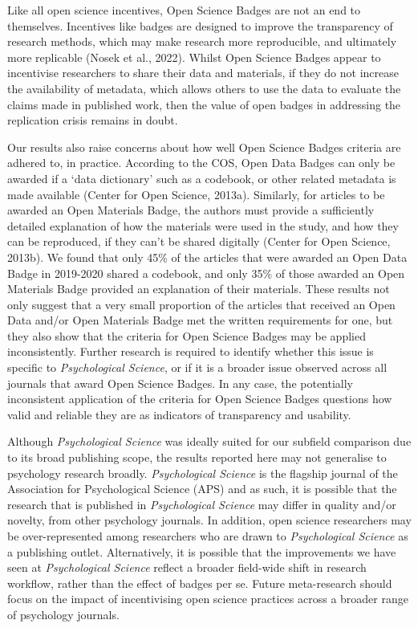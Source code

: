 \documentclass[
  english,
  man,floatsintext]{apa6}
\begin{document}
Like all open science incentives, Open Science Badges are not an end to themselves. Incentives like badges are designed to improve the transparency of research methods, which may make research more reproducible, and ultimately more replicable (Nosek et al., 2022). Whilst Open Science Badges appear to incentivise researchers to share their data and materials, if they do not increase the availability of metadata, which allows others to use the data to evaluate the claims made in published work, then the value of open badges in addressing the replication crisis remains in doubt.

Our results also raise concerns about how well Open Science Badges criteria are adhered to, in practice. According to the COS, Open Data Badges can only be awarded if a `data dictionary' such as a codebook, or other related metadata is made available (Center for Open Science, 2013a). Similarly, for articles to be awarded an Open Materials Badge, the authors must provide a sufficiently detailed explanation of how the materials were used in the study, and how they can be reproduced, if they can't be shared digitally (Center for Open Science, 2013b). We found that only 45\% of the articles that were awarded an Open Data Badge in 2019-2020 shared a codebook, and only 35\% of those awarded an Open Materials Badge provided an explanation of their materials. These results not only suggest that a very small proportion of the articles that received an Open Data and/or Open Materials Badge met the written requirements for one, but they also show that the criteria for Open Science Badges may be applied inconsistently. Further research is required to identify whether this issue is specific to \emph{Psychological Science}, or if it is a broader issue observed across all journals that award Open Science Badges. In any case, the potentially inconsistent application of the criteria for Open Science Badges questions how valid and reliable they are as indicators of transparency and usability.

Although \emph{Psychological Science} was ideally suited for our subfield comparison due to its broad publishing scope, the results reported here may not generalise to psychology research broadly. \emph{Psychological Science} is the flagship journal of the Association for Psychological Science (APS) and as such, it is possible that the research that is published in \emph{Psychological Science} may differ in quality and/or novelty, from other psychology journals. In addition, open science researchers may be over-represented among researchers who are drawn to \emph{Psychological Science} as a publishing outlet. Alternatively, it is possible that the improvements we have seen at \emph{Psychological Science} reflect a broader field-wide shift in research workflow, rather than the effect of badges per se. Future meta-research should focus on the impact of incentivising open science practices across a broader range of psychology journals.
\end{document}
